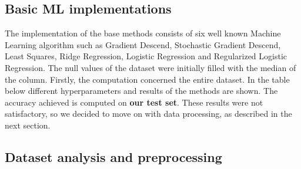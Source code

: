 \documentclass[10pt,article]{IEEEtran}
\begin{document}
\subsection{Basic ML implementations}
\label{subsec:model-impl}
The implementation of the base methods consists of six well known Machine Learning algorithm such as Gradient Descend, Stochastic Gradient Descend, Least Squares, Ridge Regression, Logistic Regression and Regularized Logistic Regression. The null values of the dataset were initially filled with the median of the column. Firstly, the computation concerned the entire dataset. In the table below different hyperparameters and results of the methods are shown. The accuracy achieved is computed on \textbf{our test set}. These results were not satisfactory, so we decided to move on with data processing, as described in the next section.

\begin{table}[h!]
  \caption{Accuracies of the six algorithms without feature processing}
  \label{tab:firstresults}
\vspace{-0.5cm}
\end{table}

\subsection{Dataset analysis and preprocessing}
\end{document}
